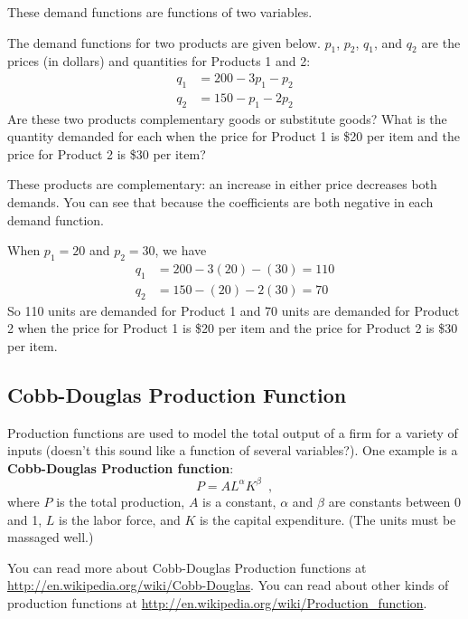 These demand functions are functions of two variables.

\begin{example}
The demand functions for two products are given below. $p_1$, $p_2$, $q_1$, and $q_2$ are the prices (in dollars) and quantities for Products 1 and 2:
\begin{align*}
q_1 &= 200-3p_1-p_2\\
q_2 &= 150-p_1-2p_2
\end{align*}
Are these two products complementary goods or substitute goods? What is the quantity demanded for each when the price for Product 1 is \$20 per item and the price for Product 2 is \$30 per item?

\begin{solution} These products are complementary: an increase in either price decreases both demands. You can see that because the coefficients are both negative in each demand function.

When $p_1=20$ and $p_2=30$, we have
\begin{align*}
q_1 &= 200-3(20)-(30)=110\\ 
q_2 &= 150-(20)-2(30)=70
\end{align*}
So 110 units are demanded for Product 1 and 70 units are demanded for Product 2 when the price for Product 1 is \$20 per item and the price for Product 2 is \$30 per item.
\end{solution}\end{example}

\subsection{Cobb-Douglas Production Function}
\label{ssec:cobb-douglas}
Production functions are used to model the total output of a firm for a variety of inputs (doesn't this sound like a function of several variables?). One example is a {\bf Cobb-Douglas Production function}:
$$P=AL^{\alpha}K^{\beta} \enspace ,$$
where $P$ is the total production, $A$ is a constant, $\alpha$ and $\beta$ are constants between 0 and 1, $L$ is the labor force, and $K$ is the capital expenditure. (The units must be massaged well.)

You can read more about Cobb-Douglas Production functions at \url{http://en.wikipedia.org/wiki/Cobb-Douglas}. You can read about other kinds of production functions at \url{http://en.wikipedia.org/wiki/Production_function}.
